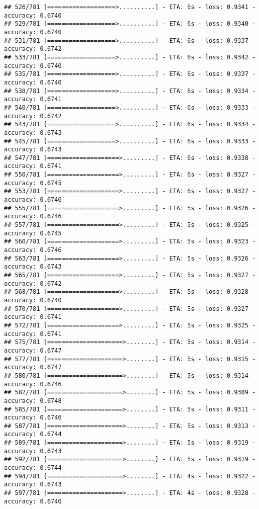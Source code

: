 \documentclass[
]{article}
\begin{document}
\begin{verbatim}
## 526/781 [===================>..........] - ETA: 6s - loss: 0.9341 - accuracy: 0.6740
## 529/781 [===================>..........] - ETA: 6s - loss: 0.9340 - accuracy: 0.6740
## 531/781 [===================>..........] - ETA: 6s - loss: 0.9337 - accuracy: 0.6742
## 533/781 [===================>..........] - ETA: 6s - loss: 0.9342 - accuracy: 0.6740
## 535/781 [===================>..........] - ETA: 6s - loss: 0.9337 - accuracy: 0.6740
## 538/781 [===================>..........] - ETA: 6s - loss: 0.9334 - accuracy: 0.6741
## 540/781 [===================>..........] - ETA: 6s - loss: 0.9333 - accuracy: 0.6742
## 543/781 [===================>..........] - ETA: 6s - loss: 0.9334 - accuracy: 0.6743
## 545/781 [===================>..........] - ETA: 6s - loss: 0.9333 - accuracy: 0.6743
## 547/781 [====================>.........] - ETA: 6s - loss: 0.9338 - accuracy: 0.6741
## 550/781 [====================>.........] - ETA: 6s - loss: 0.9327 - accuracy: 0.6745
## 553/781 [====================>.........] - ETA: 6s - loss: 0.9327 - accuracy: 0.6746
## 555/781 [====================>.........] - ETA: 5s - loss: 0.9326 - accuracy: 0.6746
## 557/781 [====================>.........] - ETA: 5s - loss: 0.9325 - accuracy: 0.6745
## 560/781 [====================>.........] - ETA: 5s - loss: 0.9323 - accuracy: 0.6746
## 563/781 [====================>.........] - ETA: 5s - loss: 0.9326 - accuracy: 0.6743
## 565/781 [====================>.........] - ETA: 5s - loss: 0.9327 - accuracy: 0.6742
## 568/781 [====================>.........] - ETA: 5s - loss: 0.9328 - accuracy: 0.6740
## 570/781 [====================>.........] - ETA: 5s - loss: 0.9327 - accuracy: 0.6741
## 572/781 [====================>.........] - ETA: 5s - loss: 0.9325 - accuracy: 0.6741
## 575/781 [=====================>........] - ETA: 5s - loss: 0.9314 - accuracy: 0.6747
## 577/781 [=====================>........] - ETA: 5s - loss: 0.9315 - accuracy: 0.6747
## 580/781 [=====================>........] - ETA: 5s - loss: 0.9314 - accuracy: 0.6746
## 582/781 [=====================>........] - ETA: 5s - loss: 0.9309 - accuracy: 0.6748
## 585/781 [=====================>........] - ETA: 5s - loss: 0.9311 - accuracy: 0.6746
## 587/781 [=====================>........] - ETA: 5s - loss: 0.9313 - accuracy: 0.6744
## 589/781 [=====================>........] - ETA: 5s - loss: 0.9319 - accuracy: 0.6743
## 592/781 [=====================>........] - ETA: 5s - loss: 0.9319 - accuracy: 0.6744
## 594/781 [=====================>........] - ETA: 4s - loss: 0.9322 - accuracy: 0.6743
## 597/781 [=====================>........] - ETA: 4s - loss: 0.9328 - accuracy: 0.6740

\end{verbatim}
\end{document}

